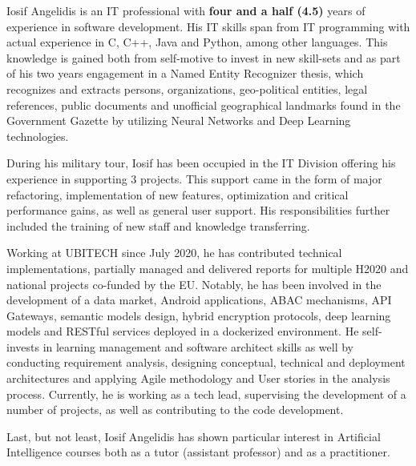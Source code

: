 \par{
Iosif Angelidis is an IT professional with \textbf{four and a half (4.5)} years of experience in software development. His IT skills span from IT programming with actual experience in C, C++, Java and Python, among other languages. This knowledge is gained both from self-motive to invest in new skill-sets and as part of his two years engagement in a Named Entity Recognizer thesis, which recognizes and extracts persons, organizations, geo-political entities, legal references, public documents and unofficial geographical landmarks found in the Government Gazette by utilizing Neural Networks and Deep Learning technologies.}

\par{During his military tour, Iosif has been occupied in the IT Division offering his experience in supporting 3 projects. This support came in the form of major refactoring, implementation of new features, optimization and critical performance gains, as well as general user support. His responsibilities further included the training of new staff and knowledge transferring.}

\par{Working at UBITECH since July 2020, he has contributed technical implementations, partially managed and delivered reports for multiple H2020 and national projects co-funded by the EU. Notably, he has been involved in the development of a data market, Android applications, ABAC mechanisms, API Gateways, semantic models design, hybrid encryption protocols, deep learning models and RESTful services deployed in a dockerized environment. He self-invests in learning management and software architect skills as well by conducting requirement analysis, designing conceptual, technical and deployment architectures and applying Agile methodology and User stories in the analysis process. Currently, he is working as a tech lead, supervising the development of a number of projects, as well as contributing to the code development.}

\par{Last, but not least, Iosif Angelidis has shown particular interest in Artificial Intelligence courses both as a tutor (assistant professor) and as a practitioner.}
